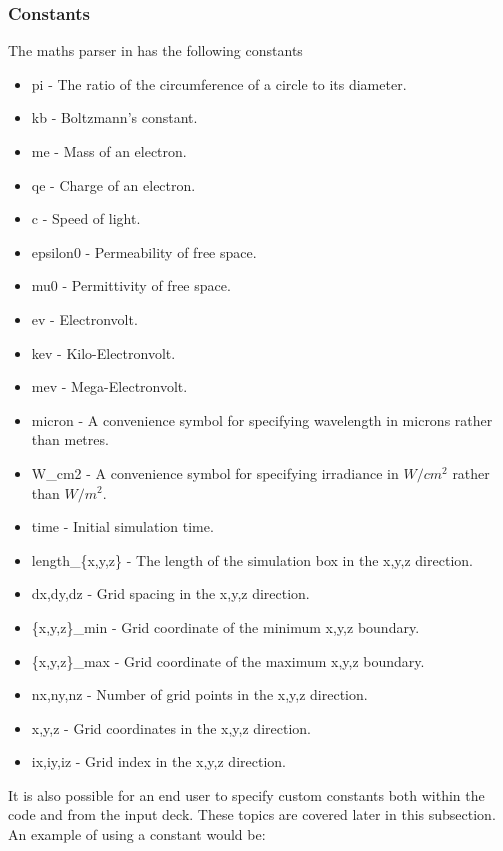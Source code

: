 \subsubsection{Constants}
\label{sec:constants}
The maths parser in {\EPOCH}  has the following constants
\begin{itemize}
\item pi - The ratio of the circumference of a circle to its diameter.
\item kb - Boltzmann's constant.
\item me - Mass of an electron.
\item qe - Charge of an electron.
\item c - Speed of light.
\item epsilon0 - Permeability of free space.
\item mu0 - Permittivity of free space.
\item ev - Electronvolt.
\item kev - Kilo-Electronvolt.
\item mev - Mega-Electronvolt.
\item micron - A convenience symbol for specifying wavelength in microns
rather than metres.
\item W\_cm2 - A convenience symbol for specifying irradiance in $W/cm^2$
rather than $W/m^2$.
\item time - Initial simulation time.
\item length\_\{x,y,z\} - The length of the simulation box in the x,y,z
  direction.
\item dx,dy,dz - Grid spacing in the x,y,z direction.
\item \{x,y,z\}\_min - Grid coordinate of the minimum x,y,z boundary.
\item \{x,y,z\}\_max - Grid coordinate of the maximum x,y,z boundary.
\item nx,ny,nz - Number of grid points in the x,y,z direction.
\item x,y,z - Grid coordinates in the x,y,z direction.
\item ix,iy,iz - Grid index in the x,y,z direction.
\end{itemize}

It is also possible for an end user to specify custom constants both within
the code and from the input deck. These topics are covered later in this
subsection. An example of using a constant would be:\\
\indent{}\\


